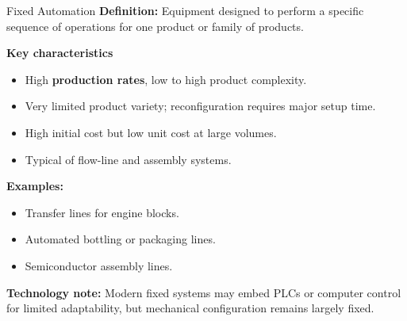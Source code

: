 \begin{frame}{Fixed Automation}
\textbf{Definition:}  
Equipment designed to perform a specific sequence of operations for one product or family of products.

\vspace{2mm}
\textbf{Key characteristics}
\begin{itemize}
  \item High \textbf{production rates}, low to high product complexity.
  \item Very limited product variety; reconfiguration requires major setup time.
  \item High initial cost but low unit cost at large volumes.
  \item Typical of flow-line and assembly systems.
\end{itemize}

\vspace{3mm}
\textbf{Examples:}
\begin{itemize}
  \item Transfer lines for engine blocks.
  \item Automated bottling or packaging lines.
  \item Semiconductor assembly lines.
\end{itemize}

\vspace{3mm}
\textbf{Technology note:}  
Modern fixed systems may embed PLCs or computer control for limited adaptability, but mechanical configuration remains largely fixed.
\end{frame}

